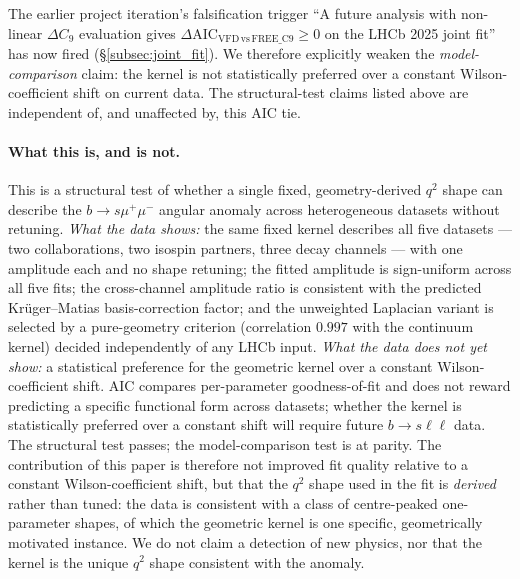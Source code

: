 The earlier project iteration's falsification trigger ``A future
analysis with non-linear $\Delta C_{9}$ evaluation gives
$\Delta\mathrm{AIC}_{\mathrm{VFD\,vs\,FREE\_C9}}\geq 0$ on the LHCb
2025 joint fit'' has now fired (\S\ref{subsec:joint_fit}). We
therefore explicitly weaken the \emph{model-comparison} claim: the
kernel is not statistically preferred over a constant
Wilson-coefficient shift on current data. The structural-test claims
listed above are independent of, and unaffected by, this AIC tie.

\paragraph{What this is, and is not.}
This is a structural test of whether a single fixed, geometry-derived
$q^{2}$ shape can describe the $b\to s\mu^{+}\mu^{-}$ angular anomaly
across heterogeneous datasets without retuning. \emph{What the data
shows:} the same fixed kernel describes all five datasets — two
collaborations, two isospin partners, three decay channels — with
one amplitude each and no shape retuning; the fitted amplitude is
sign-uniform across all five fits; the cross-channel amplitude ratio
is consistent with the predicted Krüger--Matias basis-correction
factor; and the unweighted Laplacian variant is selected by a
pure-geometry criterion (correlation $0.997$ with the continuum
kernel) decided independently of any LHCb input. \emph{What the data
does not yet show:} a statistical preference for the geometric kernel
over a constant Wilson-coefficient shift. AIC compares per-parameter
goodness-of-fit and does not reward predicting a specific functional
form across datasets; whether the kernel is statistically preferred
over a constant shift will require future $b\to s\ell\ell$ data. The
structural test passes; the model-comparison test is at parity. The
contribution of this paper is therefore not improved fit quality
relative to a constant Wilson-coefficient shift, but that the
$q^{2}$ shape used in the fit is \emph{derived} rather than tuned:
the data is consistent with a class of centre-peaked one-parameter
shapes, of which the geometric kernel is one specific, geometrically
motivated instance. We do not claim a detection of new physics, nor
that the kernel is the unique $q^{2}$ shape consistent with the
anomaly.

